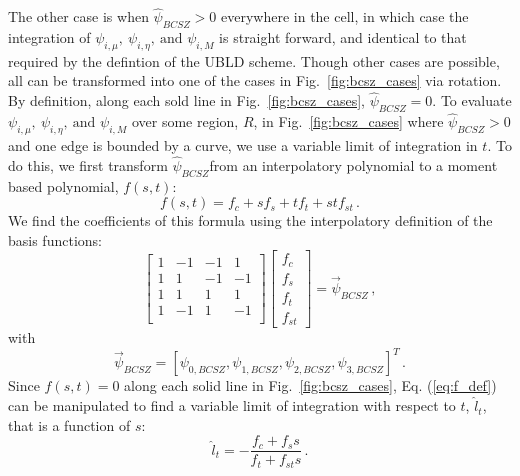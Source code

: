 \documentclass{mc2015}
\newcommand{\fig}[1]{Fig.~\ref{#1}}                      %
\newcommand{\benum}{\begin{equation}} 			%
\newcommand{\eenum}{\end{equation}}
\newcommand{\eqt}[1]{Eq. (\ref{#1})}  %
\newcommand{\BCSZH}{\ensuremath{\widehat{\psi}_{BCSZ}}}
\newcommand{\pec}{\, ,}
\newcommand{\pep}{\, .}
\begin{document}
The other case is when $\BCSZH > 0$ everywhere in the cell, in which case the integration of $\psi_{i,\mu},~\psi_{i,\eta},~\text{and }\psi_{i,M}$ is straight forward, and identical to that required by the defintion of the UBLD scheme.
Though other cases are possible, all can be transformed into one of the cases in \fig{fig:bcsz_cases} via rotation.
By definition,  along each sold line in \fig{fig:bcsz_cases}, $\BCSZH=0$.  
To evaluate $\psi_{i,\mu},~\psi_{i,\eta},~\text{and }\psi_{i,M}$ over some region, $R$, in \fig{fig:bcsz_cases} where $\BCSZH>0$ and one edge is bounded by a curve, we use a variable limit of integration in $t$.  
To do this, we first transform \BCSZH from an interpolatory polynomial to a moment based polynomial, $f(s,t)$:
\benum
f(s,t) = f_c + s f_s + t f_t + st f_{st} \pep
\label{eq:f_def}
\eenum
We find the coefficients of this formula using the interpolatory definition of the basis functions:
\benum
\left[ 
\begin{array}{cccc}
1 &	 -1	& -1 &  1    \\
1 &		1	& -1	&  -1		\\	
1 &	  1	&  1		&  1		\\
1 &		-1	& 1		&  -1		\\
\end{array}
\right]
\left[
\begin{array}{c}
f_c \\
f_s \\
f_t \\
f_{st} 
\end{array}
\right]
=\vec{\psi}_{BCSZ}
\pec
\eenum
with
\benum
\vec{\psi}_{BCSZ} = \left[ \psi_{0,BCSZ},
\psi_{1,BCSZ},
\psi_{2,BCSZ},
\psi_{3,BCSZ} \right]^T
\pep
\eenum
Since $f(s,t)=0$ along each solid line in \fig{fig:bcsz_cases}, \eqt{eq:f_def} can be manipulated to find a variable limit of integration with respect to $t$, $\hat{l}_t$, that is a function of $s$:
\benum
\hat{l}_t  = -\frac{f_c + f_s s}{f_t + f_{st} s} \pep
\eenum
\end{document}
